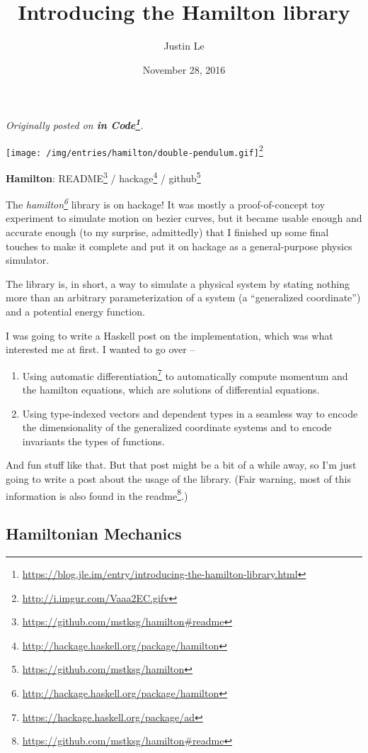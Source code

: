 \documentclass[]{article}
\title{Introducing the Hamilton library}
\author{Justin Le}
\date{November 28, 2016}
\renewcommand{\href}[2]{#2\footnote{\url{#1}}}
\begin{document}
\maketitle

\emph{Originally posted on
\textbf{\href{https://blog.jle.im/entry/introducing-the-hamilton-library.html}{in
Code}}.}

\href{http://i.imgur.com/Vaaa2EC.gifv}{\texttt{[image: /img/entries/hamilton/double-pendulum.gif]}}

\textbf{Hamilton}: \href{https://github.com/mstksg/hamilton\#readme}{README} /
\href{http://hackage.haskell.org/package/hamilton}{hackage} /
\href{https://github.com/mstksg/hamilton}{github}

The \emph{\href{http://hackage.haskell.org/package/hamilton}{hamilton}} library
is on hackage! It was mostly a proof-of-concept toy experiment to simulate
motion on bezier curves, but it became usable enough and accurate enough (to my
surprise, admittedly) that I finished up some final touches to make it complete
and put it on hackage as a general-purpose physics simulator.

The library is, in short, a way to simulate a physical system by stating nothing
more than an arbitrary parameterization of a system (a ``generalized
coordinate'') and a potential energy function.

I was going to write a Haskell post on the implementation, which was what
interested me at first. I wanted to go over --

\begin{enumerate}
\def\labelenumi{\arabic{enumi}.}
\item
  Using \href{https://hackage.haskell.org/package/ad}{automatic differentiation}
  to automatically compute momentum and the hamilton equations, which are
  solutions of differential equations.
\item
  Using type-indexed vectors and dependent types in a seamless way to encode the
  dimensionality of the generalized coordinate systems and to encode invariants
  the types of functions.
\end{enumerate}

And fun stuff like that. But that post might be a bit of a while away, so I'm
just going to write a post about the usage of the library. (Fair warning, most
of this information is also found in the
\href{https://github.com/mstksg/hamilton\#readme}{readme}.)

\hypertarget{hamiltonian-mechanics}{%
\subsection{Hamiltonian Mechanics}\label{hamiltonian-mechanics}}
\end{document}
